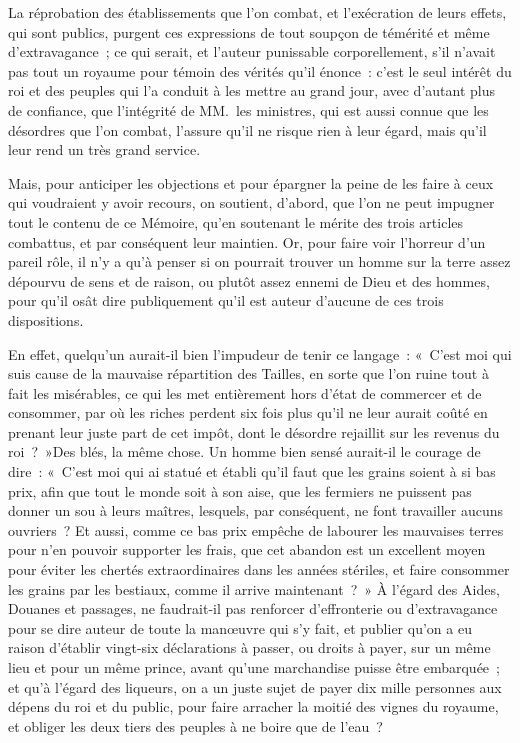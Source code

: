 \documentclass[french,twoside]{book} %
\begin{document}
La réprobation des établissements que l’on combat, et l’exécration de leurs effets, qui sont publics, purgent ces expressions de tout soupçon de témérité et même d’extravagance ; ce qui serait, et l’auteur punissable corporellement, s’il n’avait pas tout un royaume pour témoin des vérités qu’il énonce : c’est le seul intérêt du roi et des peuples qui l’a conduit à les mettre au grand jour, avec d’autant plus de confiance, que l’intégrité de MM. les ministres, qui est aussi connue que les désordres que l’on combat, l’assure qu’il ne risque rien à leur égard, mais qu’il leur rend un très grand service.\par
Mais, pour anticiper les objections et pour épargner la peine de les faire à ceux qui voudraient y avoir recours, on soutient, d’abord, que l’on ne peut impugner tout le contenu de ce Mémoire, qu’en soutenant le mérite des trois articles combattus, et par conséquent leur maintien. Or, pour faire voir l’horreur d’un pareil rôle, il n’y a qu’à penser si on pourrait trouver un homme sur la terre assez dépourvu de sens et de raison, ou plutôt assez ennemi de Dieu et des hommes, pour qu’il osât dire publiquement qu’il est auteur d’aucune de ces trois dispositions.\par
En effet, quelqu’un aurait-il bien l’impudeur de tenir ce langage : « C’est moi qui suis cause de la mauvaise répartition des Tailles, en sorte que l’on ruine tout à fait les misérables, ce qui les met entièrement hors d’état de commercer et de consommer, par où les riches perdent six fois plus qu’il ne leur aurait coûté en prenant leur juste part de cet impôt, dont le désordre rejaillit sur les revenus du roi ? »Des blés, la même chose. Un homme bien sensé aurait-il le courage de dire : « C’est moi qui ai statué et établi qu’il faut que les grains soient à si bas prix, afin que tout le monde soit à son aise, que les fermiers ne puissent pas donner un sou à leurs maîtres, lesquels, par conséquent, ne font travailler aucuns ouvriers ? Et aussi, comme ce bas prix empêche de labourer les mauvaises terres pour n’en pouvoir supporter les frais, que cet abandon est un excellent moyen pour éviter les chertés extraordinaires dans les années stériles, et faire consommer les grains par les bestiaux, comme il arrive maintenant ? » À l’égard des Aides, Douanes et passages, ne faudrait-il pas renforcer d’effronterie ou d’extravagance pour se dire auteur de toute la manœuvre qui s’y fait, et publier qu’on a eu raison d’établir vingt-six déclarations à passer, ou droits à payer, sur un même lieu et pour un même prince, avant qu’une marchandise puisse être embarquée ; et qu’à l’égard des liqueurs, on a un juste sujet de payer dix mille personnes aux dépens du roi et du public, pour faire arracher la moitié des vignes du royaume, et obliger les deux tiers des peuples à ne boire que de l’eau ?\par
\end{document}
